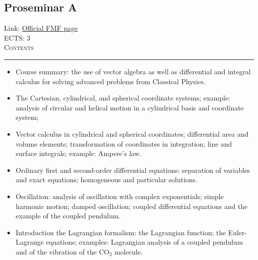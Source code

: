 \documentclass[11pt, a4paper]{article}
\newenvironment{course}[3]{
\subsection{#1}%
Link: \href{#2}{Official FMF page}\\%
ECTS: #3%
\vspace{1ex}
\\
{\large \textsc{Contents}}\\[-0.9ex]%
\rule{\textwidth}{0.5pt}
\vspace{-3ex}
}
{}
\newenvironment{chapter}[1]{
\begin{tcolorbox}[title=#1, breakable]
}
{\end{tcolorbox}}
\begin{document}
\begin{course}{Proseminar A}{https://www.fmf.uni-lj.si/en/study-physics/programmes/1fiz/2020/7000777/courses/1170/}{3}
    \label{proseminar-a}

    \begin{chapter}{Material}
        \begin{itemize}
            
            \item Course summary: the use of vector algebra as well as differential and integral calculus for solving advanced problems from Classical Physics.

            \item The Cartesian, cylindrical, and spherical coordinate systems; example: analysis of circular and helical motion in a cylindrical basis and coordinate system;

            \item Vector calculus in cylindrical and spherical coordinates; differential area and volume elements; transformation of coordinates in integration; line and surface integrals; example: Ampere's law.

            \item Ordinary first and second-order differential equations: separation of variables and exact equations; homogeneous and particular solutions.

            \item Oscillation: analysis of oscillation with complex exponentials; simple harmonic motion; damped oscillation; coupled differential equations and the example of the coupled pendulum.

            \item Introduction the Lagrangian formalism: the Lagrangian function; the Euler-Lagrange equations; examples: Lagrangian analysis of a coupled pendulum and of the vibration of the $ \mathrm{CO}_{2} $ molecule.

        \end{itemize}
    \end{chapter}

\end{course}
\end{document}
